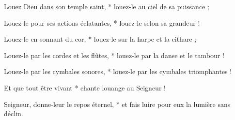 \item Louez Dieu dans son temple saint, * louez-le au ciel de sa puissance ;

\item Louez-le pour ses actions éclatantes, * louez-le selon sa grandeur !

\item Louez-le en sonnant du cor, * louez-le sur la harpe et la cithare ;

\item Louez-le par les cordes et les flûtes, * louez-le par la danse et le tambour !

\item Louez-le par les cymbales sonores, * louez-le par les cymbales triomphantes !

\item Et que tout être vivant * chante louange au Seigneur !

\item Seigneur, donne-leur le repos éternel, * et fais luire pour eux la lumière sans déclin.